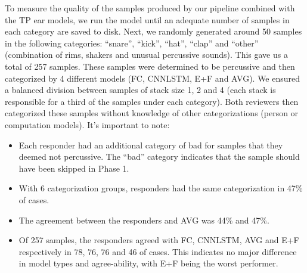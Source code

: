 \documentclass[\main/thesis.tex]{subfiles}
\begin{document}
\begin{table}[htbp]
\caption{\label{kappa_table_TPE}Table of Fleiss' kappa coefficient to measure the degree of agreement between persons (HvH), persons with FC model (H+FC), persons with CNNLSTM model, persons with all models (H+ALL), and between the 3 models. \enquote{Drop Rule} column indicates if any samples were dropped. We show the measurements after dropping samples if they are deemed bad by either or both responders. We also show measurements after dropping the \enquote{other} category along with samples deemed bad by either responder. }
\end{table}
To measure the quality of the samples produced by our pipeline combined with the TP ear models, we run the model until an adequate number of samples in each category are saved to disk. Next, we randomly generated around 50 samples in the following categories: \enquote{snare}, \enquote{kick}, \enquote{hat}, \enquote{clap} and \enquote{other} (combination of rims, 
shakers and unusual percussive sounds). This gave us a total of 257 samples. These samples were determined to be percussive and then categorized by 4 different models (FC, CNNLSTM, E+F and AVG). We ensured a balanced division between samples of stack size 1, 2 and 4 (each stack is responsible for a third of the samples under each category). Both reviewers then categorized these samples without knowledge of other categorizations (person or computation models). It's important to note:
\begin{itemize}
    \item Each responder had an additional category of bad for samples that they deemed not percussive. The \enquote{bad} category indicates that the sample should have been skipped in Phase 1. 
    \item With 6 categorization groups, responders had the same categorization in 47\% of cases.
    \item The agreement between the responders and AVG was 44\% and 47\%.
    \item Of 257 samples, the responders agreed with FC, CNNLSTM, AVG and E+F respectively in 78, 76, 76 and 46 of cases. This indicates no major difference in model types and agree-ability, with E+F being the worst performer.
\end{itemize}
\end{document}
